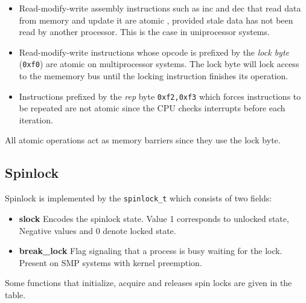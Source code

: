 \documentclass{article}
\begin{document}
\begin{itemize}
  \item Read-modify-write assembly instructions such as inc and dec
    that read data from memory and update it are atomic , provided
    stale data has not been read by another processor. This is the
    case in uniprocessor systems.

  \item Read-modify-write instructions whose opcode is prefixed by the
    \emph{lock byte} (\lstinline{0xf0}) are atomic on multiprocessor
    systems.  The lock byte will lock access to the mememory bus until
    the locking instruction finishes its operation.
  \item Instructions prefixed by the \emph{rep} byte \lstinline{0xf2,0xf3}
    which forces instructions to be repeated are not atomic since the
    CPU checks interrupts before each iteration.

\end{itemize}

All atomic operations act as memory barriers since they use the lock
byte.


\subsection{Spinlock}

Spinlock is implemented by the \lstinline{spinlock_t} which consists
of two fields:

\begin{itemize}
  \item \textbf{slock} Encodes the spinlock state. Value 1 corresponds
    to unlocked state, Negative values and 0 denote locked state.
  
  \item \textbf{break\_lock} Flag signaling that a process is busy
    waiting for the lock. Present on SMP systems with kernel
    preemption.    
\end{itemize}

Some functions that initialize, acquire and releases spin locks are
given in the table.
\end{document}
